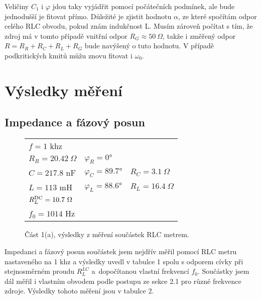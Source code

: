 \documentclass[a4paper,11pt]{article}
\begin{document}
Veličiny $ C_1 $ i $ \varphi $ jdou taky vyjádřit pomocí počátečních podmínek, ale bude jednodušší je fitovat přímo. Důležité je zjistit hodnotu $ \alpha $, ze které spočítám odpor celého RLC obvodu, pokud znám indukčnost L. Musím zároveň počítat s tím, že zdroj má v tomto případě vnitřní odpor $ R_G \approx 50\ \Omega $, takže i změřený odpor $ R = R_R + R_C + R_L + R_G $ bude navýšený o tuto hodnotu. V případě podkritických kmitů můžu znovu fitovat i $ \omega_0$.


\section{Výsledky měření}

\subsection{Impedance a fázový posun}

\begin{wrapfigure}[8]{tr}{0.5\textwidth}
    \vspace{-25pt}
    \begin{tabular}{lll}
        \hline \hline
        $f= 1 $ khz		&& \\
        $R_R= 20.42\ \Omega$	& $\varphi_R = 0°$	  & \\
        $C=217.8 $ nF		    & $\varphi_C = 89.7°$ & $R_C = 3.1\ \Omega$  \\
        $L=113 $ mH		    & $\varphi_L = 88.6°$ & $R_L = 16.4\ \Omega$ \\ \hline 
        $R^{\rm DC}_L=10.7\ \Omega$& \\
        \hline
        $f_0= 1014$ Hz		&& \\
        \hline \hline
    \end{tabular}
    \captionsetup{type=table}
    \caption{Část 1(a), výsledky z měření součástek RLC metrem.}
\end{wrapfigure}

Impedanci a fázový posun součástek jsem nejdřív měřil pomocí RLC metru nastaveného na 1 khz a výsledky uvedl v tabulce 1 spolu s odporem cívky při stejnosměrném proudu $ R_L^{LC} $ a~dopočítanou vlastní frekvencí $ f_0 $. Součástky jsem dál měřil i vlastním obvodem podle postupu ze sekce 2.1 pro různé frekvence zdroje. Výsledky tohoto měření jsou v tabulce 2.
\end{document}
